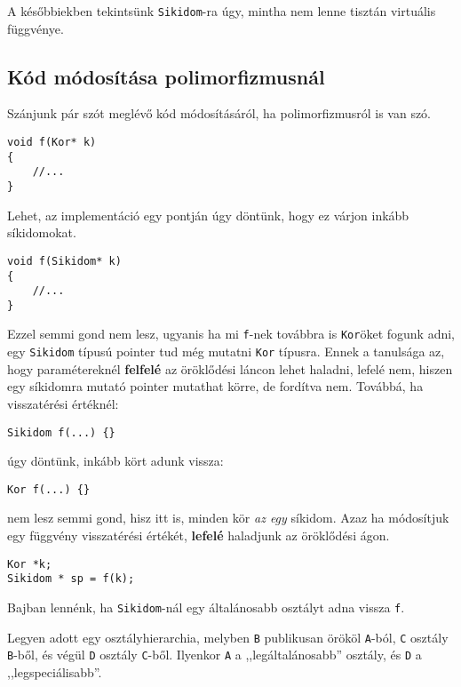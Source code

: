 \documentclass[a4paper,11.5pt,table]{article}
\begin{document}
	A későbbiekben tekintsünk \texttt{Sikidom}-ra úgy, mintha nem lenne tisztán virtuális függvénye.
	\subsection{Kód módosítása polimorfizmusnál}
	\smallskip
	Szánjunk pár szót meglévő kód módosításáról, ha polimorfizmusról is van szó.
	\begin{lstlisting}
void f(Kor* k)
{
	//...
}
	\end{lstlisting}
	Lehet, az implementáció egy pontján úgy döntünk, hogy ez várjon inkább síkidomokat.
	\begin{lstlisting}
void f(Sikidom* k)
{
	//...
}
	\end{lstlisting}
	Ezzel semmi gond nem lesz, ugyanis ha mi \texttt{f}-nek továbbra is \texttt{Kor}öket fogunk adni, egy \texttt{Sikidom} típusú pointer tud még mutatni \texttt{Kor} típusra. Ennek a tanulsága az, hogy paramétereknél \textbf{felfelé} az öröklődési láncon lehet haladni, lefelé nem, hiszen egy síkidomra mutató pointer mutathat körre, de fordítva nem. Továbbá, ha visszatérési értéknél:
	\begin{lstlisting}
Sikidom f(...) {}
	\end{lstlisting}
	úgy döntünk, inkább kört adunk vissza:
	\begin{lstlisting}
Kor f(...) {}
	\end{lstlisting}
	nem lesz semmi gond, hisz itt is, minden kör \textit{az egy} síkidom. Azaz ha módosítjuk egy függvény visszatérési értékét, \textbf{lefelé} haladjunk az öröklődési ágon.
	\begin{lstlisting}
Kor *k;
Sikidom * sp = f(k);
	\end{lstlisting}
	Bajban lennénk, ha \texttt{Sikidom}-nál egy általánosabb osztályt adna vissza \texttt{f}.
	\medskip
	
	Legyen adott egy osztályhierarchia, melyben \texttt{B} publikusan örököl \texttt{A}-ból, \texttt{C} osztály \texttt{B}-ből, és végül \texttt{D} osztály \texttt{C}-ből. Ilyenkor \texttt{A} a ,,legáltalánosabb'' osztály, és \texttt{D} a ,,legspeciálisabb''.
	
\end{document}
